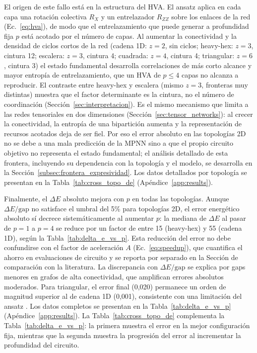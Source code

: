 \documentclass[11pt,a4paper,spanish]{book}
\begin{document}
El origen de este fallo está en la estructura del HVA. El ansatz aplica en cada capa una rotación colectiva $R_X$ y un entrelazador $R_{ZZ}$ sobre los enlaces de la red (Ec.~\ref{eq:hva}), de modo que el entrelazamiento que puede generar a profundidad fija $p$ está acotado por el número de capas. Al aumentar la conectividad y la densidad de ciclos cortos de la red (cadena 1D: $z = 2$, sin ciclos; heavy-hex: $z = 3$, cintura 12; escalera: $z = 3$, cintura 4; cuadrada: $z = 4$, cintura 4; triangular: $z = 6$, cintura 3) el estado fundamental desarrolla correlaciones de más corto alcance y mayor entropía de entrelazamiento, que un HVA de $p \leq 4$ capas no alcanza a reproducir. El contraste entre heavy-hex y escalera (mismo $z = 3$, fronteras muy distintas) muestra que el factor determinante es la cintura, no el número de coordinación (Sección~\ref{sec:interpretacion}). Es el mismo mecanismo que limita a las redes tensoriales en dos dimensiones (Sección~\ref{sec:tensor_networks}): al crecer la conectividad, la entropía de una bipartición aumenta y la representación de recursos acotados deja de ser fiel. Por eso el error absoluto en las topologías 2D no se debe a una mala predicción de la MPNN sino a que el propio circuito objetivo no representa el estado fundamental; el análisis detallado de esta frontera, incluyendo su dependencia con la topología y el modelo, se desarrolla en la Sección~\ref{subsec:frontera_expresividad}. Los datos detallados por topología se presentan en la Tabla~\ref{tab:cross_topo_de} (Apéndice~\ref{app:results}).

Finalmente, el $\Delta E$ absoluto mejora con $p$ en todas las topologías. Aunque $\Delta E/\text{gap}$ no satisface el umbral del 5\% para topologías 2D, el error energético absoluto sí decrece sistemáticamente al aumentar $p$: la mediana de $\Delta E$ al pasar de $p=1$ a $p=4$ se reduce por un factor de entre 15 (heavy-hex) y 55 (cadena 1D), según la Tabla~\ref{tab:delta_e_vs_p}. Esta reducción del error no debe confundirse con el factor de aceleración $A$ (Ec.~\ref{eq:speedup}), que cuantifica el ahorro en evaluaciones de circuito y se reporta por separado en la Sección de comparación con la literatura. La discrepancia con $\Delta E/\text{gap}$ se explica por gaps menores en grafos de alta conectividad, que amplifican errores absolutos moderados. Para triangular, el error final (0,020) permanece un orden de magnitud superior al de cadena 1D (0,001), consistente con una limitación del ansatz \citep{tripathi2026}. Los datos completos se presentan en la Tabla~\ref{tab:delta_e_vs_p} (Apéndice~\ref{app:results}). La Tabla~\ref{tab:cross_topo_de} complementa la Tabla~\ref{tab:delta_e_vs_p}: la primera muestra el error en la mejor configuración fija, mientras que la segunda muestra la progresión del error al incrementar la profundidad del circuito.
\end{document}
